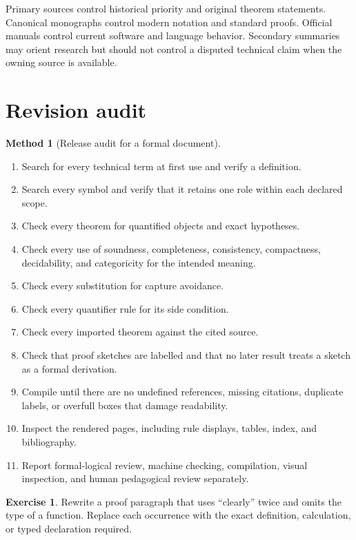 \documentclass[11pt,oneside,openany]{book}
\theoremstyle{definition}
\newtheorem{exercise}[definition]{Exercise}
\newtheorem{method}[definition]{Method}
\theoremstyle{plain}
\theoremstyle{remark}
\begin{document}
Primary sources control historical priority and original theorem statements.
Canonical monographs control modern notation and standard proofs.  Official
manuals control current software and language behavior.  Secondary summaries
may orient research but should not control a disputed technical claim when the
owning source is available.

\section{Revision audit}
\label{sec:latex-style-06}

\begin{method}[Release audit for a formal document]
\begin{enumerate}
  \item Search for every technical term at first use and verify a definition.
  \item Search every symbol and verify that it retains one role within each
        declared scope.
  \item Check every theorem for quantified objects and exact hypotheses.
  \item Check every use of soundness, completeness, consistency, compactness,
        decidability, and categoricity for the intended meaning.
  \item Check every substitution for capture avoidance.
  \item Check every quantifier rule for its side condition.
  \item Check every imported theorem against the cited source.
  \item Check that proof sketches are labelled and that no later result treats a
        sketch as a formal derivation.
  \item Compile until there are no undefined references, missing citations,
        duplicate labels, or overfull boxes that damage readability.
  \item Inspect the rendered pages, including rule displays, tables, index, and
        bibliography.
  \item Report formal-logical review, machine checking, compilation, visual
        inspection, and human pedagogical review separately.
\end{enumerate}
\end{method}

\begin{exercise}
\label{ex:latex-style-01}
Rewrite a proof paragraph that uses ``clearly'' twice and omits the type of a
function.  Replace each occurrence with the exact definition, calculation, or
typed declaration required.
\end{exercise}
\end{document}
